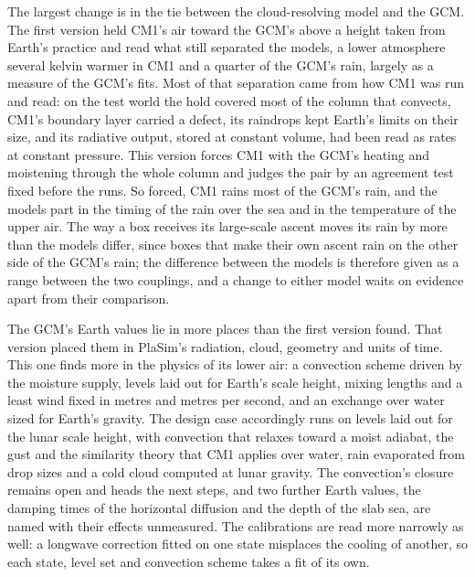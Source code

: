 The largest change is in the tie between the cloud-resolving model and the GCM. The first version held CM1's air
toward the GCM's above a height taken from Earth's practice and read what still separated the models, a lower
atmosphere several kelvin warmer in CM1 and a quarter of the GCM's rain, largely as a measure of the GCM's fits. Most of
that separation came from how CM1 was run and read: on the test world the hold covered most of the column that
convects, CM1's boundary layer carried a defect, its raindrops kept Earth's limits on their size, and its radiative
output, stored at constant volume, had been read as rates at constant
pressure. This version forces CM1 with the GCM's heating and moistening
through the whole column and judges the pair by an agreement test fixed before the runs. So
forced, CM1 rains most of the GCM's rain, and the models part in the timing of the rain over the sea and in the
temperature of the upper air. The way a box receives its large-scale ascent moves its rain by more than
the models differ, since boxes that make their own ascent rain on the other side of the GCM's rain; the difference
between the models is therefore given as a range between the two couplings, and a change to either model waits on
evidence apart from their comparison.

The GCM's Earth values lie in more places than the first version found. That version placed them in PlaSim's
radiation, cloud, geometry and units of time. This one finds more in the physics of its lower air: a convection
scheme driven by the moisture supply, levels laid out for Earth's scale height, mixing lengths and a least wind
fixed in metres and metres per second, and an exchange over water sized for Earth's
gravity. The design case accordingly runs on levels laid out for the lunar scale height, with
convection that relaxes toward a moist adiabat, the gust and the similarity theory that CM1 applies over water,
rain evaporated from drop sizes and a cold cloud computed at lunar
gravity. The convection's closure remains open and heads the
next steps, and two further Earth values, the damping times of the horizontal diffusion and the depth of the slab
sea, are named with their effects unmeasured. The calibrations are read more
narrowly as well: a longwave correction fitted on one state misplaces the cooling of another, so each state, level
set and convection scheme takes a fit of its own.

